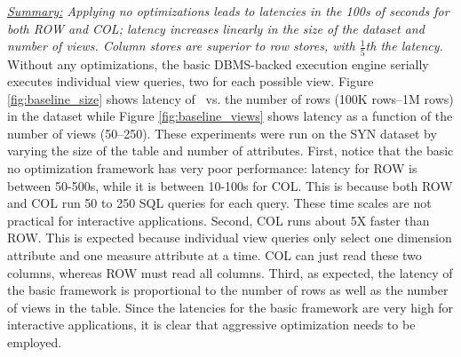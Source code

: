 {\em \underline{Summary:} Applying no optimizations 
leads to latencies in the 100s of seconds for both ROW and COL;
latency increases linearly in the size of the dataset and  number
of views. 
Column stores are superior to row stores,
with $\frac{1}{5}$th the latency.}
Without any optimizations, the basic DBMS-backed execution engine
serially executes individual view queries, two for each possible view.
Figure \ref{fig:baseline_size} shows latency of \SeeDB\ vs. the number of rows (100K rows--1M rows) in the dataset while  
Figure \ref{fig:baseline_views} shows latency as a function 
of the number of views (50--250).
These experiments were run on the SYN dataset by varying the size of the
table and number of attributes.
First, notice that the basic no optimization framework has very 
poor performance: latency for ROW is between 50-500s, 
while it is between 10-100s for COL. 
This is because both ROW and COL run 50 to 250 SQL queries for each \SeeDB query.
These time scales are not practical for interactive applications. 
Second, COL runs about 5X faster than ROW. 
This is expected because individual view queries only select one dimension
attribute and one measure attribute at a time.  
COL can just read these two
columns, whereas ROW must read all columns.
Third, as expected, the latency of the
basic framework is proportional to the number of rows as well as the 
number of views in the table.
Since the latencies for the basic framework are very high for interactive
applications, it is clear that aggressive optimization needs to be employed. 





